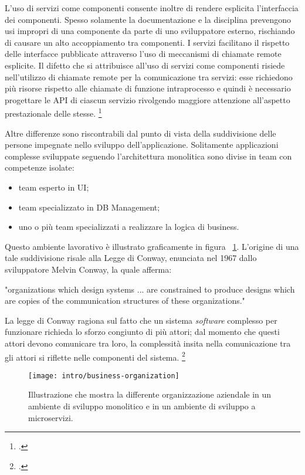 L'uso di servizi come componenti consente inoltre di rendere esplicita l'interfaccia dei componenti.
Spesso solamente la documentazione e la disciplina prevengono usi impropri di una componente da parte di uno sviluppatore esterno, rischiando di causare un alto accoppiamento tra componenti.
I servizi facilitano il rispetto delle interfacce pubblicate attraverso l'uso di meccanismi di chiamate remote esplicite.
Il difetto che si attribuisce all'uso di servizi come componenti risiede nell'utilizzo di chiamate remote per la comunicazione tra servizi:
esse richiedono più risorse rispetto alle chiamate di funzione intraprocesso e quindi è necessario progettare le API di ciascun servizio rivolgendo maggiore attenzione all'aspetto prestazionale delle stesse.
\footcite{site:fowler-microservices}

Altre differenze sono riscontrabili dal punto di vista della suddivisione delle persone impegnate nello sviluppo dell'applicazione.
Solitamente applicazioni complesse sviluppate seguendo l'architettura monolitica sono divise in team con competenze isolate:

\begin{itemize}
  \item team esperto in UI;
  \item team specializzato in DB Management;
  \item uno o più team specializzati a realizzare la logica di business.
\end{itemize}

Questo ambiente lavorativo è illustrato graficamente in figura ~\ref{fig:business-organization}.
L'origine di una tale suddivisione risale alla Legge di Conway, enunciata nel 1967 dallo sviluppatore Melvin Conway, la quale afferma:
\begin{displayquote}
  "organizations which design systems ... are constrained to produce designs which are copies of the communication structures of these organizations."
\end{displayquote}

La legge di Conway ragiona sul fatto che un sistema \emph{software} complesso per funzionare richieda lo sforzo congiunto di più attori; dal momento che questi attori devono comunicare tra loro, la complessità insita nella comunicazione tra gli attori si riflette nelle componenti del sistema.
\footcite{site:conway}

\begin{figure}[H]
  \centering
  \texttt{[image: intro/business-organization]}
  \caption{Illustrazione che mostra la differente organizzazione aziendale in un ambiente di sviluppo monolitico e in un ambiente di sviluppo a microservizi.\\ \cite{site:fowler-microservices}}
  \label{fig:business-organization}
\end{figure}

